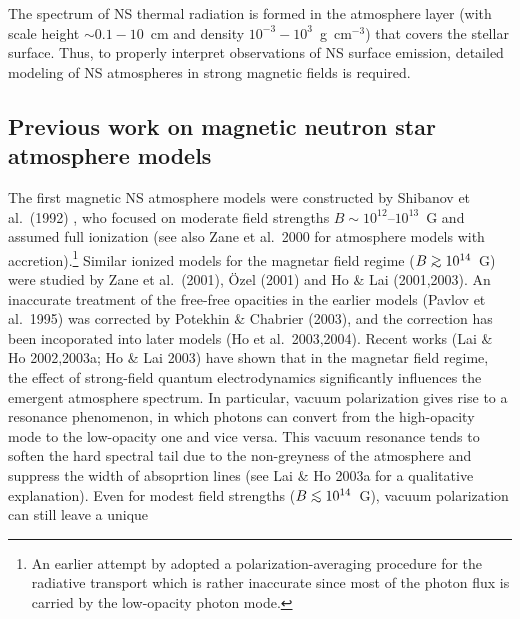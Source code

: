 \documentclass[useAMS,onecolumn,usenatbib,usegraphicx]{mn2e}
\def\go{\mathrel{\raise.3ex\hbox{$>$}\mkern-14mu\lower0.6ex\hbox{$\sim$}}}
\def\lo{\mathrel{\raise.3ex\hbox{$<$}\mkern-14mu\lower0.6ex\hbox{$\sim$}}}
\begin{document}
The spectrum of NS thermal radiation is formed in the atmosphere layer
(with scale height $\sim 0.1-10$~cm and density $10^{-3}-10^3$~g~cm$^{-3}$)
that covers the stellar surface. Thus, to  
properly interpret observations of NS surface emission, 
detailed modeling of NS atmospheres in strong magnetic fields is required.


\subsection{Previous work on magnetic neutron star atmosphere models}

The first magnetic NS atmosphere models were constructed
by Shibanov et al.~(1992) 
%
%
\citep[see also][]{Pavlovetal95a,Rajagopaletal97a,ZavlinPavlov02a},
who focused on moderate field strengths 
$B\sim 10^{12}$--$10^{13}$~G and assumed full ionization 
%
%
(see also Zane et al.~2000 for atmosphere models with accretion).\footnote{An earlier 
attempt by \citet[][]{Miller92a} adopted a 
polarization-averaging procedure for the radiative transport which is rather
inaccurate since most of the photon flux is carried by the low-opacity photon
mode.}
Similar ionized models for the magnetar field regime ($B\go 10^{14}$~G)
were studied by Zane et al.~(2001), \"Ozel (2001) and Ho \& Lai (2001,2003).
An inaccurate treatment of the free-free opacities in the earlier models
(Pavlov et al.~1995) was corrected by Potekhin \& Chabrier (2003), and
the correction has been incoporated into later models 
(Ho et al.~2003,2004). Recent works (Lai \& Ho 2002,2003a; Ho \& Lai 2003)
have shown that in the magnetar field regime, the effect of
strong-field quantum electrodynamics significantly influences 
the emergent atmosphere spectrum. In particular, vacuum polarization
gives rise to a resonance phenomenon, in which photons can convert 
from the high-opacity mode to the low-opacity one and vice versa.
This vacuum resonance tends to soften the 
hard spectral tail due to the non-greyness of the 
atmosphere and suppress the width of absoprtion lines (see Lai \& Ho 2003a
for a qualitative explanation). Even for modest field strengths 
($B\lo 10^{14}$~G), vacuum polarization can still leave a unique 
%
\end{document}

